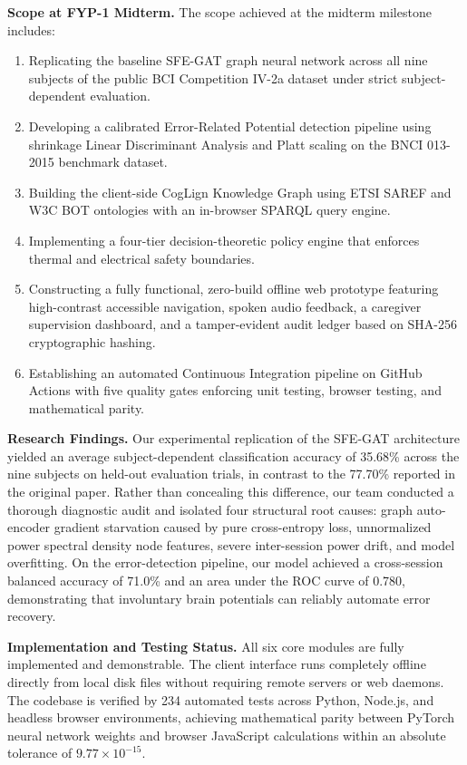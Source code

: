 \documentclass[12pt,a4paper]{report}
\begin{document}
\textbf{Scope at FYP-1 Midterm.} The scope achieved at the midterm milestone includes:
\begin{enumerate}[leftmargin=1.5em]
    \item Replicating the baseline SFE-GAT graph neural network across all nine subjects of the public BCI Competition IV-2a dataset under strict subject-dependent evaluation.
    \item Developing a calibrated Error-Related Potential detection pipeline using shrinkage Linear Discriminant Analysis and Platt scaling on the BNCI 013-2015 benchmark dataset.
    \item Building the client-side CogLign Knowledge Graph using ETSI SAREF and W3C BOT ontologies with an in-browser SPARQL query engine.
    \item Implementing a four-tier decision-theoretic policy engine that enforces thermal and electrical safety boundaries.
    \item Constructing a fully functional, zero-build offline web prototype featuring high-contrast accessible navigation, spoken audio feedback, a caregiver supervision dashboard, and a tamper-evident audit ledger based on SHA-256 cryptographic hashing.
    \item Establishing an automated Continuous Integration pipeline on GitHub Actions with five quality gates enforcing unit testing, browser testing, and mathematical parity.
\end{enumerate}

\textbf{Research Findings.} Our experimental replication of the SFE-GAT architecture yielded an average subject-dependent classification accuracy of 35.68\% across the nine subjects on held-out evaluation trials, in contrast to the 77.70\% reported in the original paper. Rather than concealing this difference, our team conducted a thorough diagnostic audit and isolated four structural root causes: graph auto-encoder gradient starvation caused by pure cross-entropy loss, unnormalized power spectral density node features, severe inter-session power drift, and model overfitting. On the error-detection pipeline, our model achieved a cross-session balanced accuracy of 71.0\% and an area under the ROC curve of 0.780, demonstrating that involuntary brain potentials can reliably automate error recovery.

\textbf{Implementation and Testing Status.} All six core modules are fully implemented and demonstrable. The client interface runs completely offline directly from local disk files without requiring remote servers or web daemons. The codebase is verified by 234 automated tests across Python, Node.js, and headless browser environments, achieving mathematical parity between PyTorch neural network weights and browser JavaScript calculations within an absolute tolerance of $9.77 \times 10^{-15}$.
\end{document}
